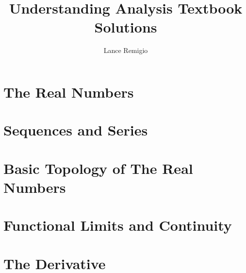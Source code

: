 \documentclass[11pt]{book}
\title{Understanding Analysis Textbook Solutions}
\author{Lance Remigio}
\begin{document}
\maketitle
\tableofcontents

\chapter{The Real Numbers}







\chapter{Sequences and Series}














\chapter{Basic Topology of The Real Numbers}








\chapter{Functional Limits and Continuity}











\chapter{The Derivative}
\end{document}
